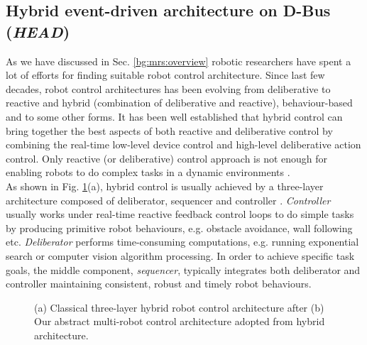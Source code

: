 \subsection{Hybrid event-driven architecture on D-Bus ({\em HEAD})}
As we have discussed in Sec. \ref{bg:mrs:overview} robotic researchers have spent a lot of efforts for finding suitable robot control architecture. Since last few decades, robot control architectures has been evolving from deliberative to reactive and hybrid (combination of deliberative and reactive), behaviour-based and to some other forms. It has been well established that hybrid control can bring together the best aspects of both reactive and deliberative control by combining the real-time low-level device control and high-level deliberative action control. Only reactive (or deliberative) control approach is not enough for enabling robots to do complex tasks in a dynamic environments \cite{Gat1997}.\\
As shown in Fig. \ref{fig:three-layer-arch}(a), hybrid control is usually achieved by a three-layer architecture composed of deliberator, sequencer and controller . {\em Controller} usually works under real-time reactive feedback control loops to do simple tasks by producing primitive robot behaviours, e.g. obstacle avoidance, wall following etc. {\em Deliberator} performs time-consuming computations, e.g. running exponential search or computer vision algorithm processing. In order to achieve specific task goals, the middle component, {\em sequencer}, typically integrates both deliberator and controller maintaining consistent, robust and timely robot behaviours.\\
\begin{figure}
\centering
{} 
\hspace{0.25cm}
\caption{(a) Classical three-layer hybrid robot control architecture after \protect{} 
(b) Our abstract multi-robot control architecture adopted from hybrid architecture.}
\label{fig:three-layer-arch}
\end{figure}
